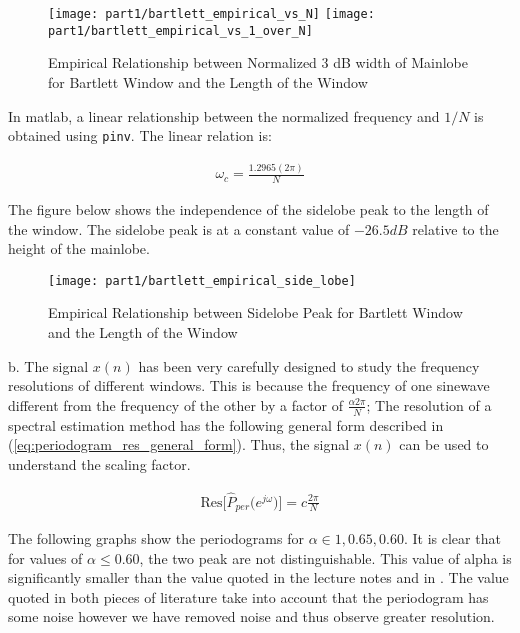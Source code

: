 \begin{figure}[H]
\centering{}
\texttt{[image: part1/bartlett\_empirical\_vs\_N]}
\texttt{[image: part1/bartlett\_empirical\_vs\_1\_over\_N]}
\caption{Empirical Relationship between Normalized 3 dB width of Mainlobe for Bartlett Window and the Length of the Window}
\end{figure}


\noindent{}In matlab, a linear relationship between the normalized frequency and $1/N$ is obtained using \texttt{pinv}. The linear relation is:

\begin{align*}
\omega_{c}=\frac{1.2965(2\pi)}{N}
\end{align*}


\noindent{}The figure below shows the independence of the sidelobe peak to the length of the window. The sidelobe peak is at a constant value of $-26.5 dB$ relative to the height of the mainlobe.

\begin{figure}[H]
\centering{}
\texttt{[image: part1/bartlett\_empirical\_side\_lobe]}
\caption{Empirical Relationship between Sidelobe Peak for Bartlett Window and the Length of the Window}
\end{figure}

\noindent{}b. The signal $x(n)$ has been very carefully designed to study the frequency resolutions of different windows. This is because the frequency of one sinewave different from the frequency of the other by a factor of $\frac{\alpha 2\pi}{N}$; The resolution of a spectral estimation method has the following general form described in (\ref{eq:periodogram_res_general_form}). Thus, the signal $x(n)$ can be used to understand the scaling factor.

\begin{align}
\text{Res}\Bigg[\hat{P}_{per}\bigg(e^{j\omega}\bigg)\Bigg] = c\frac{2\pi}{N} \label{eq:periodogram_res_general_form}
\end{align}

\noindent{}The following graphs show the periodograms for $\alpha \in {1, 0.65, 0.60}$. It is clear that for values of $\alpha \leq 0.60$, the two peak are not distinguishable. This value of alpha is significantly smaller than the value quoted in the lecture notes and in \cite{hayes2009statistical}. The value quoted in both pieces of literature take into account that the periodogram has some noise however we have removed noise and thus observe greater resolution. 

